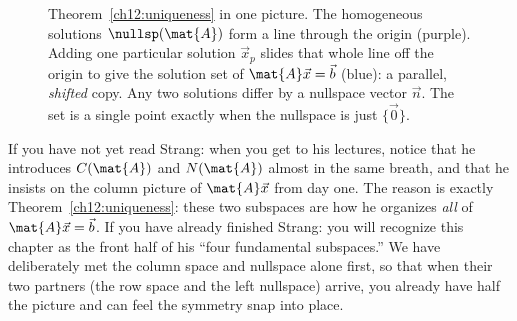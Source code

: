 \begin{figure}[H]
\centering
{}
\caption{Theorem~\ref{ch12:uniqueness} in one picture. The homogeneous solutions
$\nullsp(\mat{A})$ form a line through the origin (purple). Adding one particular
solution $\vec{x}_p$ slides that whole line off the origin to give the solution
set of $\mat{A}\vec{x}=\vec{b}$ (blue): a parallel, \emph{shifted} copy. Any two
solutions differ by a nullspace vector $\vec{n}$. The set is a single point
exactly when the nullspace is just $\{\vec 0\}$.}
\label{ch12:fig-affine}
\end{figure}

\begin{strangbox}
If you have not yet read Strang: when you get to his lectures, notice that he
introduces $C(\mat{A})$ and $N(\mat{A})$ almost in the same breath, and that he
insists on the column picture of $\mat{A}\vec{x}$ from day one. The reason is
exactly Theorem~\ref{ch12:uniqueness}: these two subspaces are how he organizes
\emph{all} of $\mat{A}\vec{x}=\vec{b}$. If you have already finished Strang: you
will recognize this chapter as the front half of his ``four fundamental
subspaces.'' We have deliberately met the column space and nullspace alone first,
so that when their two partners (the row space and the left nullspace) arrive, you
already have half the picture and can feel the symmetry snap into place.
\end{strangbox}

